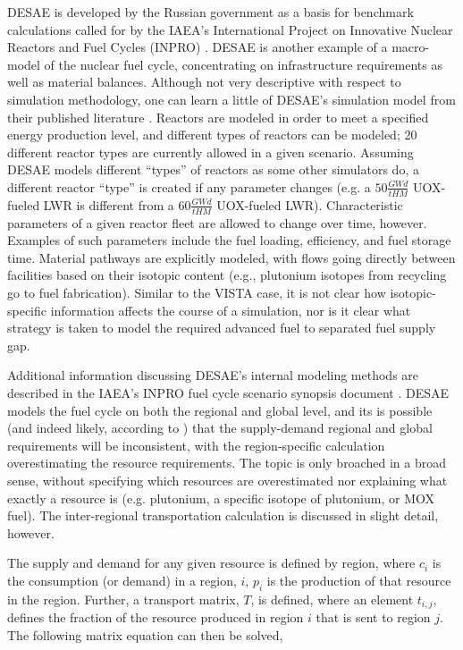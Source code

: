 DESAE is developed by the Russian government as a basis for benchmark
calculations called for by the IAEA's International Project on Innovative
Nuclear Reactors and Fuel Cycles (INPRO)
\cite{_international_2009,andrianova_desae_2008}. DESAE is another example of a
macro-model of the nuclear fuel cycle, concentrating on infrastructure
requirements as well as material balances. Although not very descriptive with
respect to simulation methodology, one can learn a little of DESAE's simulation
model from their published literature \cite{andrianova_desae_2008}. Reactors are
modeled in order to meet a specified energy production level, and different
types of reactors can be modeled; 20 different reactor types are currently
allowed in a given scenario. Assuming DESAE models different ``types'' of
reactors as some other simulators do, a different reactor ``type'' is created if
any parameter changes (e.g. a $50 \frac{GW d}{tHM}$ UOX-fueled LWR is different
from a $60 \frac{GW d}{tHM}$ UOX-fueled LWR). Characteristic parameters of a
given reactor fleet are allowed to change over time, however. Examples of such
parameters include the fuel loading, efficiency, and fuel storage time. Material
pathways are explicitly modeled, with flows going directly between facilities
based on their isotopic content (e.g., plutonium isotopes from recycling go to
fuel fabrication). Similar to the VISTA case, it is not clear how
isotopic-specific information affects the course of a simulation, nor is it
clear what strategy is taken to model the required advanced fuel to separated
fuel supply gap.

Additional information discussing DESAE's internal modeling methods are
described in the IAEA's INPRO fuel cycle scenario synopsis document
\cite{iaea_nuclear_2010}.  DESAE models the fuel cycle on both the regional and
global level, and its is possible (and indeed likely, according to
\cite{iaea_nuclear_2010}) that the supply-demand regional and global
requirements will be inconsistent, with the region-specific calculation
overestimating the resource requirements. The topic is only broached in a broad
sense, without specifying which resources are overestimated nor explaining what
exactly a resource is (e.g. plutonium, a specific isotope of plutonium, or MOX
fuel). The inter-regional transportation calculation is discussed in slight
detail, however.

The supply and demand for any given resource is defined by region, where $c_i$
is the consumption (or demand) in a region, $i$, $p_i$ is the production of that
resource in the region. Further, a transport matrix, $T$, is defined, where an
element $t_{i,j}$, defines the fraction of the resource produced in region $i$
that is sent to region $j$. The following matrix equation can then be solved,

